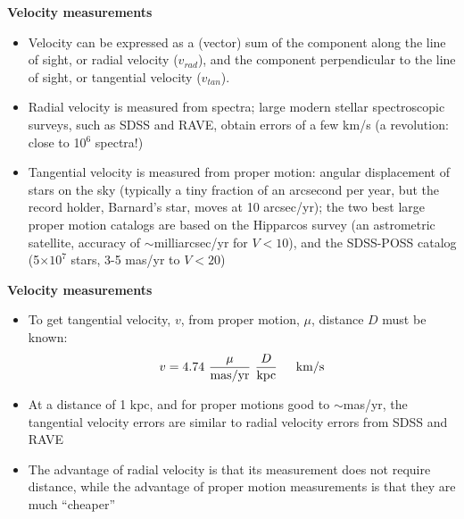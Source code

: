 \documentclass[letterpaper,landscape]{slides}
\begin{document}
\begin{slide}

\begin{center}
\bfseries
\large {} Velocity measurements 
\end{center}
\vskip 0.2in
\begin{itemize}
\item Velocity can be expressed as a (vector) sum of the component 
along the line of sight, or radial velocity ($v_{rad}$), and the component
perpendicular to the line of sight, or tangential velocity ($v_{tan}$). 
\item {\color{blue} Radial velocity is measured from spectra;} large modern stellar
  spectroscopic surveys, such as SDSS and RAVE, obtain errors of a few km/s
  (a revolution: close to 10$^6$ spectra!)
\item {\color{blue} Tangential velocity is measured from proper motion:} angular displacement
   of stars on the sky (typically a tiny fraction of an arcsecond per year,
   but the record holder, Barnard's star, moves at 10 arcsec/yr);
   the two best large proper motion catalogs are based on the Hipparcos 
   survey (an astrometric satellite, accuracy of $\sim$milliarcsec/yr for $V<10$), 
   and the SDSS-POSS catalog (5$\times10^7$ stars, 3-5 mas/yr to $V<20$)
\end{itemize}    
\vfill

\end{slide}



\begin{slide}

\begin{center}
\bfseries
\large {} Velocity measurements 
\end{center}
\vskip 0.2in
\begin{itemize}
\item To get tangential velocity, $v$, from proper motion, $\mu$, distance $D$ 
must be known:
{\color{blue}
\begin{equation}
 v  = 4.74 \,\, {\mu \over {\rm mas/yr}} \,\, {D \over {\rm kpc} } \,\,\,\,\,\,\,\,\, {\rm km/s}
 \nonumber
\end{equation}
}
\item At a distance of 1 kpc, and for proper motions good to $\sim$mas/yr, 
the tangential velocity errors are similar to radial velocity errors from 
SDSS and RAVE
\item The advantage of radial velocity is that its measurement does not
require distance, while the advantage of proper motion measurements is
that they are much ``cheaper''
\end{itemize}    
\vfill

\end{slide}
\end{document}
